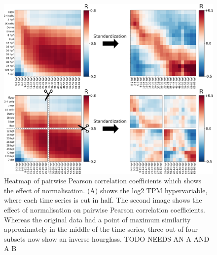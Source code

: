 \begin{figure}[H]
    \includegraphics[width=\linewidth]{ch4.hourglass/images/normalisation.png}
    \caption{Heatmap of pairwise Pearson correlation coefficients which shows the effect of normalisation. (A) shows the log2 TPM hypervariable, where each time series is cut in half. The second image shows the effect of normalisation on pairwise Pearson correlation coefficients. Whereas the original data had a point of maximum similarity approximately in the middle of the time series, three out of four subsets now show an inverse hourglass. TODO NEEDS AN A AND A B}
    \label{fig:normalisation}
\end{figure}

